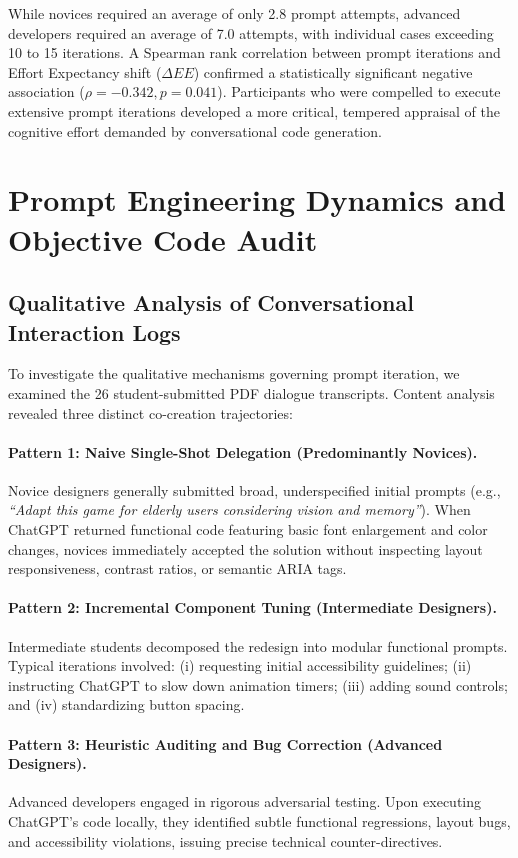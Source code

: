 \documentclass{cleiej}
\begin{document}
While novices required an average of only 2.8 prompt attempts, advanced developers required an average of 7.0 attempts, with individual cases exceeding 10 to 15 iterations. A Spearman rank correlation between prompt iterations and Effort Expectancy shift ($\Delta EE$) confirmed a statistically significant negative association ($\rho = -0.342, p = 0.041$). Participants who were compelled to execute extensive prompt iterations developed a more critical, tempered appraisal of the cognitive effort demanded by conversational code generation.

\FloatBarrier
\section{Prompt Engineering Dynamics and Objective Code Audit}
\label{sec:audit}

\subsection{Qualitative Analysis of Conversational Interaction Logs}
To investigate the qualitative mechanisms governing prompt iteration, we examined the 26 student-submitted PDF dialogue transcripts. Content analysis revealed three distinct co-creation trajectories:

\paragraph{Pattern 1: Naive Single-Shot Delegation (Predominantly Novices).}
Novice designers generally submitted broad, underspecified initial prompts (e.g., \textit{``Adapt this game for elderly users considering vision and memory''}). When ChatGPT returned functional code featuring basic font enlargement and color changes, novices immediately accepted the solution without inspecting layout responsiveness, contrast ratios, or semantic ARIA tags.

\paragraph{Pattern 2: Incremental Component Tuning (Intermediate Designers).}
Intermediate students decomposed the redesign into modular functional prompts. Typical iterations involved: (i) requesting initial accessibility guidelines; (ii) instructing ChatGPT to slow down animation timers; (iii) adding sound controls; and (iv) standardizing button spacing.

\paragraph{Pattern 3: Heuristic Auditing and Bug Correction (Advanced Designers).}
Advanced developers engaged in rigorous adversarial testing. Upon executing ChatGPT's code locally, they identified subtle functional regressions, layout bugs, and accessibility violations, issuing precise technical counter-directives.
\end{document}
